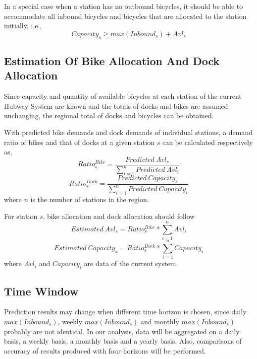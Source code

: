 \documentclass[journal, letterpaper]{IEEEtran}
\begin{document}
In a special case when a station has no outbound bicycles, it should be able to accommodate all inbound bicycles and bicycles that are allocated to the station initially, i.e., 
$$Capacity_{s} \ge max(Inbound_{s}) + Avl_{s}$$
\subsection{Estimation Of Bike Allocation And Dock Allocation}
Since capacity and quantity of available bicycles at each station of the current Hubway System are known and the totals of docks and bikes are assumed unchanging, the regional total of docks and bicycles can be obtained. 

With predicted bike demands and dock demands of individual stations, a demand ratio of bikes and that of docks at a given station $s$ can be calculated respectively as, 
$$Ratio_{s}^{Bike} = \frac{Predicted \ Avl_{s}}{\sum_{i=1}^{n}Predicted \ Avl_{i}}$$
$$Ratio_{s}^{Dock} = \frac{Predicted \ Capacity_{s}}{\sum_{i=1}^{n}Predicted \ Capacity_{i}}$$
where $n$ is the number of stations in the region.

For station $s$, bike allocation and dock allocation should follow
$$Estimated \ Avl_{s} = Ratio_{s}^{Bike} * \sum_{i=1}^{n}Avl_{i}$$
$$Estimated \ Capacity_{s} = Ratio_{s}^{Dock} * \sum_{i=1}^{n}Capacity_{i}$$
where $Avl_{i}$ and $Capacity_{i}$ are data of the current system.
\subsection{Time Window}
Prediction results may change when different time horizon is chosen, since daily $max(Inbound_{s})$, weekly $max(Inbound_{s})$ and monthly $max(Inbound_{s})$ probably are not identical. In our analysis, data will be aggregated on a daily basis, a weekly basis, a monthly basis and a yearly basis. Also, comparisons of accuracy of results produced with four horizons will be performed.
\end{document}
